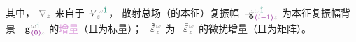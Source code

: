 其中，{\one} $\mathcolor{gray}{\nabla_z}$ 来自于 $\xint{\mathcolor{gray}{-}}{21}{\bar{\bar{V}}}^{\;\! \mathcolor{gray}{\omega} \textcolor{PineGreen}{\hat{1}}}_{\;\! \mathcolor{gray}{z}}$，{\two} \textcolor{NavyBlue}{散射总场}（的\textcolor{PineGreen}{本征}）\textcolor{PineGreen}{复振幅} $\xint{\begin{smallmatrix} ~ \\ {}^{}_{\mathcolor{gray}{-}} \\ ~ \end{smallmatrix}}{09}{\tilde{\mathtt{g}}}^{\;\!\mathcolor{gray}{\omega} \textcolor{PineGreen}{\hat{1}}}_{\;\! \textcolor{Plum}{(i-1)} \mathcolor{gray}{z}}$ 为\textcolor{PineGreen}{本征复振幅}\textcolor{NavyBlue}{背景} $\xint{\begin{smallmatrix} ~ \\ {}^{}_{\mathcolor{gray}{-}} \\ ~ \end{smallmatrix}}{09}{\mathtt{g}}^{\;\!\mathcolor{gray}{\omega} \textcolor{PineGreen}{\hat{1}}}_{\;\! \textcolor{Plum}{(0)} \mathcolor{gray}{z}}$ 的\textcolor{Plum}{增量}（且为标量）；{\three} $\xint{\begin{smallmatrix} ~ \\ {}^{}_{\mathcolor{gray}{-}} \\ ~ \end{smallmatrix}}{16}{\tilde{\tilde{\varepsilon}}}^{\;\! \mathcolor{gray}{\omega}}_{\;\! \mathcolor{gray}{z}}$ 为 $\xint{\begin{smallmatrix} ~ \\ {}^{}_{\mathcolor{gray}{-}} \\ ~ \end{smallmatrix}}{16}{\bar{\bar{\varepsilon}}}^{\;\! \mathcolor{gray}{\omega}}_{\;\! \mathcolor{gray}{z}}$ 的\textcolor{NavyBlue}{微扰增量}（且为矩阵）。

